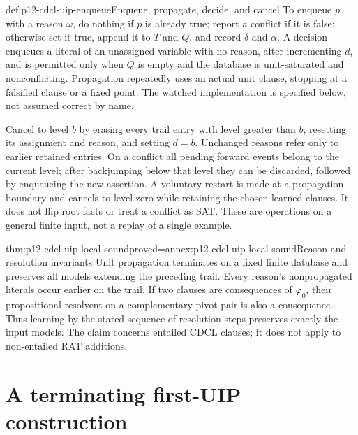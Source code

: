 \begin{hbmethod}{def:p12-cdcl-uip-enqueue}{Enqueue, propagate, decide, and cancel}
To enqueue \(p\) with a reason \(\omega\), do nothing if \(p\) is
already true; report a conflict if it is false; otherwise set it true, append
it to \(T\) and \(Q\), and record \(\delta\) and \(\alpha\).
A decision enqueues a literal of an unassigned variable with no reason,
after incrementing \(d\), and is permitted only when \(Q\) is empty and
the database is unit-saturated and nonconflicting.  Propagation repeatedly
uses an actual unit clause, stopping at a falsified clause or a fixed point.
The watched implementation is specified below, not assumed correct by name.

Cancel to level \(b\) by erasing every trail entry with level greater than
\(b\), resetting its assignment and reason, and setting \(d=b\).
Unchanged reasons refer only to earlier retained entries.  On a conflict all
pending forward events belong to the current level; after backjumping below
that level they can be discarded, followed by enqueueing the new assertion.
A voluntary restart is made at a propagation boundary and cancels to level
zero while retaining the chosen learned clauses.  It does not flip root facts
or treat a conflict as SAT.  These are operations on a general finite input,
not a replay of a single example.
\end{hbmethod}

\begin{hblemma}{thm:p12-cdcl-uip-local-sound}{proved=annex:p12-cdcl-uip-local-sound}{Reason and resolution invariants}
Unit propagation terminates on a fixed finite database and preserves all
models extending the preceding trail.  Every reason's nonpropagated literals
occur earlier on the trail.  If two clauses are consequences of
\(\varphi_0\), their propositional resolvent on a complementary pivot pair
is also a consequence.  Thus learning by the stated sequence of resolution
steps preserves exactly the input models.  The claim concerns entailed CDCL
clauses; it does not apply to non-entailed RAT additions.
\end{hblemma}

\section{A terminating first-UIP construction}


